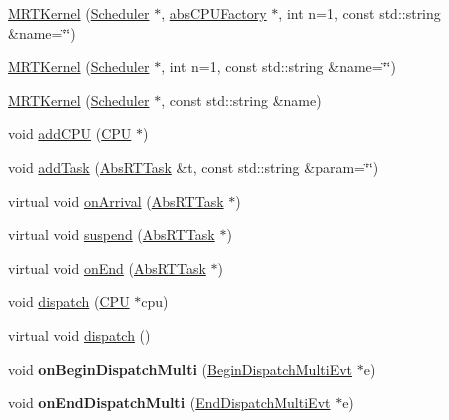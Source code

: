 \begin{DoxyCompactItemize}
\item 
\hyperlink{classRTSim_1_1MRTKernel_a0af9407b80533f14021f3a0385ff9d12}{M\+R\+T\+Kernel} (\hyperlink{classRTSim_1_1Scheduler}{Scheduler} $\ast$, \hyperlink{classRTSim_1_1absCPUFactory}{abs\+C\+P\+U\+Factory} $\ast$, int n=1, const std\+::string \&name=\char`\"{}\char`\"{})
\item 
\hyperlink{classRTSim_1_1MRTKernel_a215e28dc1d5b2161befc74901bf5dfb9}{M\+R\+T\+Kernel} (\hyperlink{classRTSim_1_1Scheduler}{Scheduler} $\ast$, int n=1, const std\+::string \&name=\char`\"{}\char`\"{})
\item 
\hyperlink{classRTSim_1_1MRTKernel_ab4248818c4f41c5b4621781899424c76}{M\+R\+T\+Kernel} (\hyperlink{classRTSim_1_1Scheduler}{Scheduler} $\ast$, const std\+::string \&name)
\item 
void \hyperlink{classRTSim_1_1MRTKernel_a903c249fc30d7f9f2fc4c4fd7270b5be}{add\+C\+PU} (\hyperlink{classRTSim_1_1CPU}{C\+PU} $\ast$)
\item 
void \hyperlink{classRTSim_1_1MRTKernel_a040cdf664733c628ac532341938be7f7}{add\+Task} (\hyperlink{classRTSim_1_1AbsRTTask}{Abs\+R\+T\+Task} \&t, const std\+::string \&param=\char`\"{}\char`\"{})
\item 
virtual void \hyperlink{classRTSim_1_1MRTKernel_abf3b27a6c51995a47539214345d9b193}{on\+Arrival} (\hyperlink{classRTSim_1_1AbsRTTask}{Abs\+R\+T\+Task} $\ast$)
\item 
virtual void \hyperlink{classRTSim_1_1MRTKernel_a016ed93346f3505e11389cb8a8cdc777}{suspend} (\hyperlink{classRTSim_1_1AbsRTTask}{Abs\+R\+T\+Task} $\ast$)
\item 
virtual void \hyperlink{classRTSim_1_1MRTKernel_a9bc95fb1eaa73383b470ed6122770f44}{on\+End} (\hyperlink{classRTSim_1_1AbsRTTask}{Abs\+R\+T\+Task} $\ast$)
\item 
void \hyperlink{classRTSim_1_1MRTKernel_a8283b7b4c2cd26b8ae345b9242c4436b}{dispatch} (\hyperlink{classRTSim_1_1CPU}{C\+PU} $\ast$cpu)
\item 
virtual void \hyperlink{classRTSim_1_1MRTKernel_a2c93872c83ec92ebb02f788d80a3a874}{dispatch} ()
\item 
void {\bfseries on\+Begin\+Dispatch\+Multi} (\hyperlink{classRTSim_1_1BeginDispatchMultiEvt}{Begin\+Dispatch\+Multi\+Evt} $\ast$e)\hypertarget{classRTSim_1_1MRTKernel_a0a8e8fa0b649e0896e9fed39c1241e5c}{}\label{classRTSim_1_1MRTKernel_a0a8e8fa0b649e0896e9fed39c1241e5c}

\item 
void {\bfseries on\+End\+Dispatch\+Multi} (\hyperlink{classRTSim_1_1EndDispatchMultiEvt}{End\+Dispatch\+Multi\+Evt} $\ast$e)\hypertarget{classRTSim_1_1MRTKernel_a77e4370094191739b9bf845ccb65a8af}{}\label{classRTSim_1_1MRTKernel_a77e4370094191739b9bf845ccb65a8af}


\end{DoxyCompactItemize}
